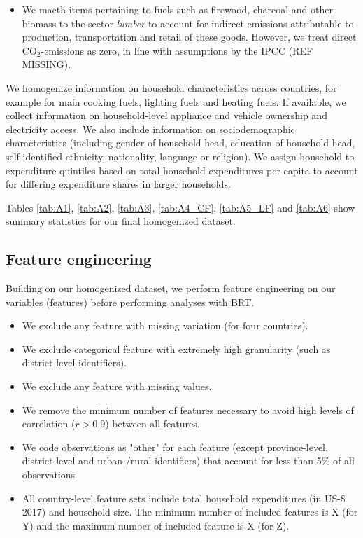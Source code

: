 \documentclass[12pt, a4paper]{article}
\begin{document}
\begin{itemize}
    \item We macth items pertaining to fuels such as firewood, charcoal and other biomass to the sector \textit{lumber} to account for indirect emissions attributable to production, transportation and retail of these goods. However, we treat direct CO$_{2}$-emissions as zero, in line with assumptions by the IPCC (REF MISSING).
\end{itemize}

We homogenize information on household characteristics across countries, for example for main cooking fuels, lighting fuels and heating fuels. If available, we collect information on household-level appliance and vehicle ownership and electricity access. We also include information on sociodemographic characteristics (including gender of household head, education of household head, self-identified ethnicity, nationality, language or religion).
We assign household to expenditure quintiles based on total household expenditures per capita to account for differing expenditure shares in larger households. 

Tables \ref{tab:A1}, \ref{tab:A2}, \ref{tab:A3}, \ref{tab:A4_CF}, \ref{tab:A5_LF} and \ref{tab:A6} show summary statistics for our final homogenized dataset. 


\subsection{Feature engineering} \label{sec:featureengineering}

Building on our homogenized dataset, we perform feature engineering on our variables (features) before performing analyses with BRT.

\begin{itemize}
    \item We exclude any feature with missing variation (for four countries).
    \item We exclude categorical feature with extremely high granularity (such as district-level identifiers).
    \item We exclude any feature with missing values.
    \item We remove the minimum number of features necessary to avoid high levels of correlation ($r>0.9$) between all features.
    \item We code observations as "other" for each feature (except province-level, district-level and urban-/rural-identifiers) that account for less than 5\% of all observations.
    \item All country-level feature sets include total household expenditures (in US-\$ 2017) and household size. The minimum number of included features is X (for Y) and the maximum number of included feature is X (for Z).
\end{itemize}
\end{document}
